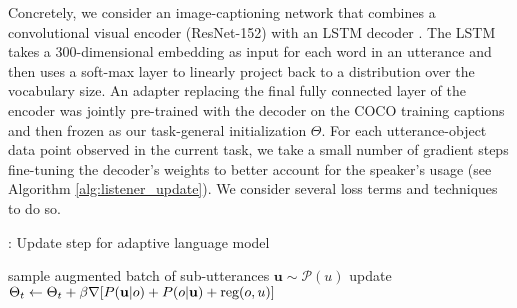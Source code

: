 Concretely, we consider an image-captioning network that combines a convolutional visual encoder (ResNet-152) with an LSTM decoder \cite{vinyals_show_2015}.
The LSTM takes a 300-dimensional embedding as input for each word in an utterance and then uses a soft-max layer to linearly project back to a distribution over the vocabulary size.
An adapter replacing the final fully connected layer of the encoder was jointly pre-trained with the decoder on the COCO training captions and then frozen as our task-general initialization $\Theta$.
For each utterance-object data point observed in the current task, we take a small number of gradient steps fine-tuning the decoder's weights to better account for the speaker's usage (see Algorithm \ref{alg:listener_update}).
We consider several loss terms and techniques to do so.

\begin{algorithm}[tb] %
	\caption{: Update step for adaptive language model}
    \label{alg:listener_update}
\begin{algorithmic}
        \STATE sample augmented batch of sub-utterances $\textbf{u} \sim \mathcal{P}(u)$
        \STATE update $\Theta_t \leftarrow \Theta_t + \beta\nabla[P(\bold{u} | o) + P(o | \bold{u})  + \text{reg}(o,u)]$
   \ENDFOR
\end{algorithmic}
\end{algorithm}

